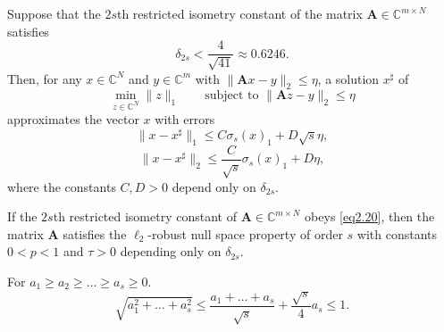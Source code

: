 \begin{theorem}
    \label{th2.12}
    Suppose that the $2s$th restricted isometry constant of the matrix $\mathbf{A} \in \mathbb{C}^{m \times N}$ satisfies
    \begin{equation}
        \delta_{2s} < \frac{4}{\sqrt{41}} \approx 0.6246.
        \label{eq2.20}
    \end{equation}
    Then, for any $x \in \mathbb{C}^N$ and $y \in \mathbb{C}^m$ with $\|\mathbf{A}x - y\|_2 \leq \eta$, a solution $x^{\sharp}$ of 
    \[
        \min\limits_{z \in \mathbb{C}^N} \|z\|_1 \qquad \text{subject to } \|\mathbf{A}z - y\|_2 \leq \eta
    \]
    approximates the vector $x$ with errors
    \[
        \|x - x^{\sharp}\|_1 \leq C \sigma_s(x)_1 + D \sqrt{s} \eta,
    \]
    \[
        \|x-x^{\sharp}\|_2 \leq \frac{C}{\sqrt{s}} \sigma_s(x)_1 + D \eta,
    \]
    where the constants $C ,D > 0$ depend only on $\delta_{2s}$.
\end{theorem}
\begin{theorem}
    \label{th2.13}
    If the $2s$th restricted isometry constant of $\mathbf{A} \in \mathbb{C}^{m\times N}$ obeys \cref{eq2.20}, then the matrix $\mathbf{A}$ satisfies the $\ell_2$-robust null space property of order $s$ with constants $0<p<1$ and $\tau > 0$ depending only on $\delta_{2s}$. 
\end{theorem}

\begin{lemma}
    \label{lm2.14}
    For $a_1 \geq a_2 \geq \dots \geq a_s \geq 0$.
    \[
        \sqrt{a_1^2 + \dots +a_s^2} \leq \frac{a_1 + \dots + a_s}{\sqrt{s}} + \frac{\sqrt{s}}{4}a_s \leq 1.
    \]
\end{lemma}














